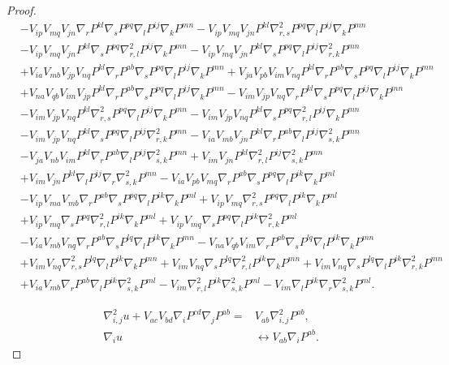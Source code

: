 \documentclass{amsart}
\theoremstyle{definition}
\theoremstyle{remark}
\numberwithin{equation}{section}
\begin{document}
\begin{proof}
\begin{align*}
&-V_{ip}V_{mq}V_{jn}\nabla_rP^{kl}\nabla_sP^{pq}\nabla_l P^{ij}\nabla_kP^{mn}-V_{ip}V_{mq}V_{jn}P^{kl}\nabla^2_{r,s}P^{pq}\nabla_l P^{ij}\nabla_kP^{mn}\\
&-V_{ip}V_{mq}V_{jn}P^{kl}\nabla_sP^{pq}\nabla^2_{r,l} P^{ij}\nabla_kP^{mn}-V_{ip}V_{mq}V_{jn}P^{kl}\nabla_sP^{pq}\nabla_l P^{ij}\nabla^2_{r,k}P^{mn}\\
&+V_{ia}V_{mb}V_{jp}V_{nq}P^{kl}\nabla_rP^{ab}\nabla_sP^{pq}\nabla_l P^{ij}\nabla_kP^{mn}+V_{ja}V_{pb}V_{im}V_{nq}P^{kl}\nabla_rP^{ab}\nabla_sP^{pq}\nabla_l P^{ij}\nabla_kP^{mn}\\
&+V_{na}V_{qb}V_{im}V_{jp}P^{kl}\nabla_rP^{ab}\nabla_sP^{pq}\nabla_l P^{ij}\nabla_kP^{mn}-V_{im}V_{jp}V_{nq}\nabla_rP^{kl}\nabla_sP^{pq}\nabla_l P^{ij}\nabla_kP^{mn}\\
&-V_{im}V_{jp}V_{nq}P^{kl}\nabla^2_{r,s}P^{pq}\nabla_l P^{ij}\nabla_kP^{mn}-V_{im}V_{jp}V_{nq}P^{kl}\nabla_sP^{pq}\nabla^2_{r,l} P^{ij}\nabla_kP^{mn}\\
&-V_{im}V_{jp}V_{nq}P^{kl}\nabla_sP^{pq}\nabla_l P^{ij}\nabla^2_{r,k}P^{mn}-V_{ia}V_{mb}V_{jn}P^{kl}\nabla_rP^{ab}\nabla_l P^{ij}\nabla^2_{s,k}P^{mn}\\
&-V_{ja}V_{nb}V_{im}P^{kl}\nabla_rP^{ab}\nabla_l P^{ij}\nabla^2_{s,k}P^{mn}+V_{im}V_{jn}P^{kl}\nabla^2_{r,l} P^{ij}\nabla^2_{s,k}P^{mn}\\
&+V_{im}V_{jn}P^{kl}\nabla_l P^{ij}\nabla_r\nabla^2_{s,k}P^{mn}-V_{ia}V_{pb}V_{mq}\nabla_rP^{ab}\nabla_sP^{pq}\nabla_lP^{ik}\nabla_kP^{ml}\\
&-V_{ip}V_{ma}V_{mb}\nabla_rP^{ab}\nabla_sP^{pq}\nabla_lP^{ik}\nabla_kP^{ml}+V_{ip}V_{mq}\nabla^2_{r,s}P^{pq}\nabla_lP^{ik}\nabla_kP^{ml}\\
&+V_{ip}V_{mq}\nabla_sP^{pq}\nabla^2_{r,l}P^{ik}\nabla_kP^{ml}+V_{ip}V_{mq}\nabla_sP^{pq}\nabla_lP^{ik}\nabla^2_{r,k}P^{ml}\\
&-V_{ia}V_{mb}V_{nq}\nabla_rP^{ab}\nabla_sP^{lq}\nabla_lP^{ik}\nabla_kP^{mn}-V_{na}V_{qb}V_{im}\nabla_rP^{ab}\nabla_sP^{lq}\nabla_lP^{ik}\nabla_kP^{mn}\\
&+V_{im}V_{nq}\nabla^2_{r,s}P^{lq}\nabla_lP^{ik}\nabla_kP^{mn}+V_{im}V_{nq}\nabla_sP^{lq}\nabla^2_{r,l}P^{ik}\nabla_kP^{mn}+V_{im}V_{nq}\nabla_sP^{lq}\nabla_lP^{ik}\nabla^2_{r,k}P^{mn}\\
&+V_{ia}V_{mb}\nabla_rP^{ab}\nabla_lP^{ik}\nabla^2_{s,k}P^{ml}-V_{im}\nabla^2_{r,l}P^{ik}\nabla^2_{s,k}P^{ml}-V_{im}\nabla_lP^{ik}\nabla_r\nabla^2_{s,k}P^{ml}.
\end{align*}

\begin{align*}
\nabla^2_{i,j}u+V_{ac}V_{bd}\nabla_iP^{cd}\nabla_jP^{ab}=& V_{ab}\nabla^2_{i,j}P^{ab},\\
\nabla_iu&\leftrightarrow V_{ab}\nabla_iP^{ab}.
\end{align*}
\end{proof}
\end{document}
